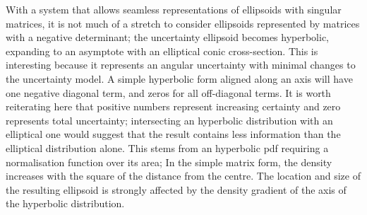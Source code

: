 \documentclass[a4paper, 11pt, titlepage]{article}
\newcounter{subsubsubsection}[subsubsection]
\begin{document}
        \label{sec:hyperbolicCase}
        With a system that allows seamless representations of ellipsoids with singular matrices, it is not much of a stretch to consider ellipsoids represented by matrices with a negative determinant; the uncertainty ellipsoid becomes hyperbolic, expanding to an asymptote with an elliptical conic cross-section.  This is interesting because it represents an angular uncertainty with minimal changes to the uncertainty model.
        A simple hyperbolic form aligned along an axis will have one negative diagonal term, and zeros for all off-diagonal terms.
        It is worth reiterating here that positive numbers represent increasing certainty and zero represents total uncertainty; intersecting an hyperbolic distribution with an elliptical one would suggest that the result contains less information than the elliptical distribution alone.
        This stems from an hyperbolic \gls{pdf} requiring a normalisation function over its area; In the simple matrix form, the density increases with the square of the distance from the centre.  The location and size of the resulting ellipsoid is strongly affected by the density gradient of the axis of the hyperbolic distribution.
\end{document}
